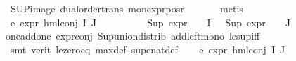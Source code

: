 \begin{isabellebody}
\ SUP{\isacharunderscore}{\kern0pt}image\ dual{\isacharunderscore}{\kern0pt}order{\isachardot}{\kern0pt}trans\ mon{\isacharunderscore}{\kern0pt}expr{\isacharunderscore}{\kern0pt}{}{\isacharunderscore}{\kern0pt}pos{\isacharunderscore}{\kern0pt}r\ \isanewline
\ \ \ \ \isamarkupfalse%
\ metis\ \isanewline
\ \ \isamarkupfalse%
\ e{}{\isacharcolon}{\kern0pt}\ {\isachardoublequoteopen}expr{\isacharunderscore}{\kern0pt}{}\ {\isacharparenleft}{\kern0pt}hml{\isacharunderscore}{\kern0pt}conj\ I\ J\ {\isasymPhi}{\isacharparenright}{\kern0pt}\ {\isasymle}\ {}{\isachardoublequoteclose}\ \isanewline
\ \ \ \ \isamarkupfalse%
\ {\isacartoucheopen}Sup\ {\isacharparenleft}{\kern0pt}{\isacharparenleft}{\kern0pt}expr{\isacharunderscore}{\kern0pt}{}\ {\isasymcirc}\ {\isasymPhi}{\isacharparenright}{\kern0pt}\ {\isacharbackquote}{\kern0pt}\ I{\isacharparenright}{\kern0pt}\ {\isasymle}\ {}{\isacartoucheclose}\ {\isacartoucheopen}Sup\ {\isacharparenleft}{\kern0pt}{\isacharparenleft}{\kern0pt}expr{\isacharunderscore}{\kern0pt}{}\ {\isasymcirc}\ {\isasymPhi}{\isacharparenright}{\kern0pt}\ {\isacharbackquote}{\kern0pt}\ J{\isacharparenright}{\kern0pt}\ {\isasymle}\ {}{\isacartoucheclose}\isanewline
one{\isacharunderscore}{\kern0pt}add{\isacharunderscore}{\kern0pt}one\ expr{\isacharunderscore}{\kern0pt}{}{\isacharunderscore}{\kern0pt}conj\ Sup{\isacharunderscore}{\kern0pt}union{\isacharunderscore}{\kern0pt}distrib\ add{\isacharunderscore}{\kern0pt}left{\isacharunderscore}{\kern0pt}mono\ le{\isacharunderscore}{\kern0pt}sup{\isacharunderscore}{\kern0pt}iff\isanewline
\ \ \ \ \isamarkupfalse%
\ {\isacharparenleft}{\kern0pt}smt\ {\isacharparenleft}{\kern0pt}verit{\isacharparenright}{\kern0pt}\ le{\isacharunderscore}{\kern0pt}zero{\isacharunderscore}{\kern0pt}eq\ max{\isacharunderscore}{\kern0pt}def\ sup{\isacharunderscore}{\kern0pt}enat{\isacharunderscore}{\kern0pt}def{\isacharparenright}{\kern0pt}\isanewline
\ \ \isamarkupfalse%
\ e{}{\isacharcolon}{\kern0pt}\ {\isachardoublequoteopen}expr{\isacharunderscore}{\kern0pt}{}\ {\isacharparenleft}{\kern0pt}hml{\isacharunderscore}{\kern0pt}conj\ I\ J\ {\isasymPhi}{\isacharparenright}{\kern0pt}\ {\isasymle}\ {}{\isachardoublequoteclose}\ \isanewline
\ \ \ \ \isamarkupfalse%

\end{isabellebody}
